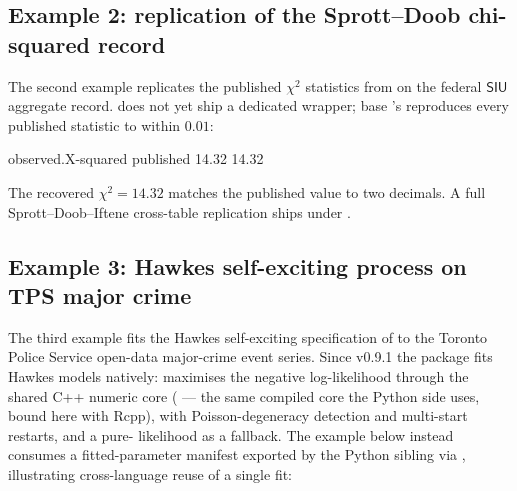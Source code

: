 \documentclass[article,shortnames,nojss]{jss}
\newcommand{\SIU}{\textsf{SIU}}
\begin{document}
\subsection{Example 2: replication of the Sprott--Doob chi-squared record}

The second example replicates the published $\chi^{2}$ statistics
from \citet{SprottDoob2023} on the federal $\SIU$ aggregate
record.  does not yet ship a dedicated
 wrapper; base 's
 reproduces every published statistic to
within $0.01$:


\begin{Code}
 observed.X-squared          published
              14.32              14.32
\end{Code}

The recovered $\chi^{2} = 14.32$ matches the published value to
two decimals. A full Sprott--Doob--Iftene cross-table replication
ships under .

\subsection{Example 3: Hawkes self-exciting process on TPS major crime}

The third example fits the Hawkes self-exciting specification of
\citet{Ruhela2026Hawkes} to the Toronto Police Service open-data
major-crime event series. Since v0.9.1 the  package fits
Hawkes models natively:  maximises the
negative log-likelihood through the shared C++ numeric core
( --- the same compiled core the Python side uses,
bound here with Rcpp), with Poisson-degeneracy detection and
multi-start restarts, and a pure- likelihood as a
fallback. The example below instead consumes a fitted-parameter
manifest exported by the Python sibling via
, illustrating cross-language
reuse of a single fit:
\end{document}
